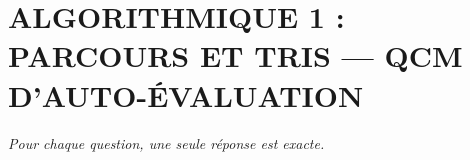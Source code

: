 
\section*{\textcolor{chapcolor}{\MakeUppercase{Algorithmique 1 : parcours et tris — QCM d'auto-évaluation}}}

\begin{center}
\textit{Pour chaque question, une seule réponse est exacte.}
\end{center}

